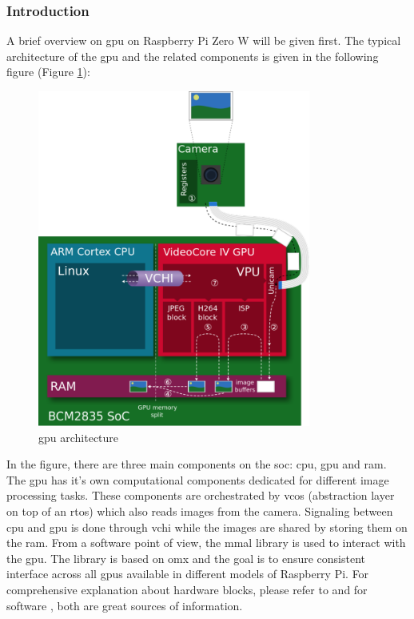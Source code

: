 \subsubsection{Introduction}
A brief overview on \ac{gpu} on Raspberry Pi Zero W will be given first. The typical architecture of the \ac{gpu} and the related components is given in the following figure (Figure \ref{fig:physical:gpu_architecture}):
 
 \begin{figure}[H]
    \centering
    \includegraphics[width=0.8\textwidth]{physical/figures/gpu_architecture}
    \caption{\ac{gpu} architecture \cite{noauthor_videocore_nodate-1}}
    \label{fig:physical:gpu_architecture}
\end{figure}

In the figure, there are three main components on the \ac{soc}: \ac{cpu}, \ac{gpu} and \ac{ram}.
The \ac{gpu} has it's own computational components dedicated for different image processing tasks.
These components are orchestrated by \ac{vcos} (abstraction layer on top of an \ac{rtos}) which also reads images from the camera.
Signaling between \ac{cpu} and \ac{gpu} is done through \ac{vchi} while the images are shared by storing them on the \ac{ram}.
From a software point of view, the \ac{mmal} library is used to interact with the \ac{gpu}.
The library is based on \ac{omx} and the goal is to ensure consistent interface across all \acp{gpu} available in different models of Raspberry Pi.
For comprehensive explanation about hardware blocks, please refer to \cite{noauthor_videocore_nodate-1} and for software \cite{noauthor_videocore_nodate}, both are great sources of information.

